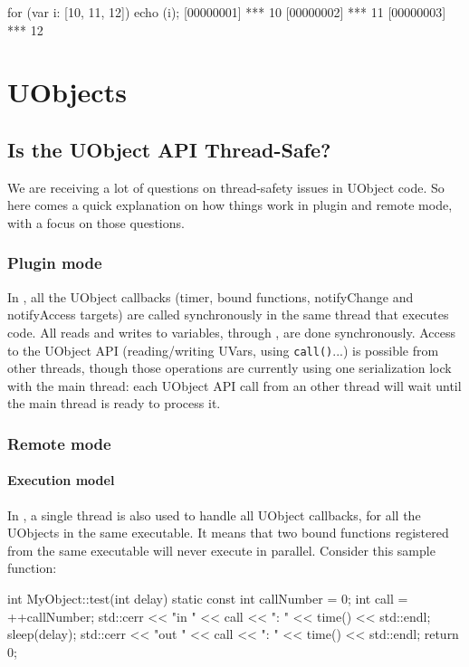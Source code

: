 \begin{urbiscript}
for (var i: [10, 11, 12]) echo (i);
[00000001] *** 10
[00000002] *** 11
[00000003] *** 12
\end{urbiscript}

\section{UObjects}
\subsection{Is the UObject API Thread-Safe?}
We are receiving a lot of questions on thread-safety issues in UObject
code. So here comes a quick explanation on how things work in plugin
and remote mode, with a focus on those questions.

\subsubsection{Plugin mode}

In , all the UObject callbacks (timer, bound
functions, notifyChange and notifyAccess targets) are called
synchronously in the same thread that executes \us code. All reads and
writes to \urbi variables, through , are done
synchronously. Access to the UObject API (reading/writing UVars, using
\lstinline|call()|...) is possible from other threads, though those
operations are currently using one serialization lock with the main
thread: each UObject API call from an other thread will wait until the
main thread is ready to process it.


\subsubsection{Remote mode}

\paragraph{Execution model}

In , a single thread is also used to handle all
UObject callbacks, for all the UObjects in the same executable. It
means that two bound functions registered from the same executable
will never execute in parallel. Consider this sample \Cxx function:

\begin{cxx}
int MyObject::test(int delay)
{
  static const int callNumber = 0;
  int call = ++callNumber;
  std::cerr << "in "  << call << ": " << time() << std::endl;
  sleep(delay);
  std::cerr << "out " << call << ": " << time() << std::endl;
  return 0;
}
\end{cxx}

